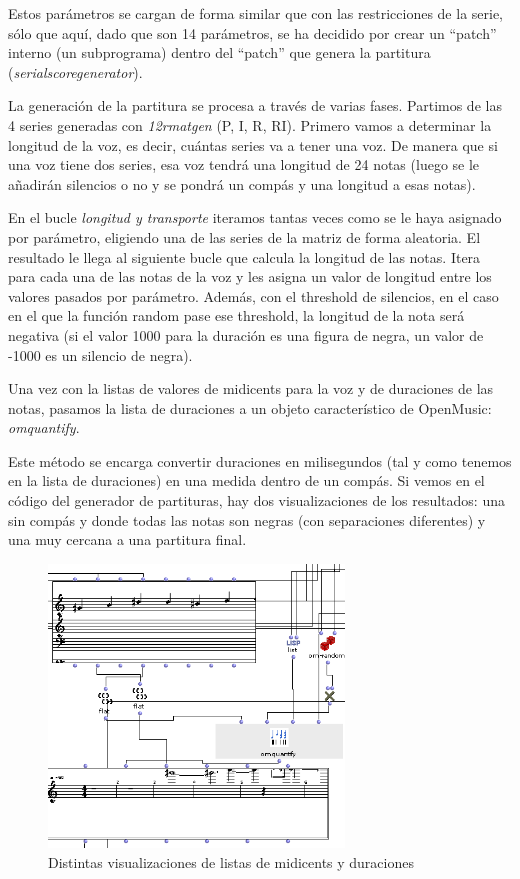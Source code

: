 \documentclass[a4paper,openany,oneside,12pt]{book}
\begin{document}
Estos parámetros se cargan de forma similar que con las restricciones de la serie, sólo que aquí, dado que son 14 parámetros, se ha decidido por crear un ``patch'' interno (un subprograma) dentro del ``patch'' que genera la partitura (\emph{serialscoregenerator}).

La generación de la partitura se procesa a través de varias fases. Partimos de las 4 series generadas con \emph{12rmatgen} (P, I, R, RI). Primero vamos a determinar la longitud de la voz, es decir, cuántas series va a tener una voz. De manera que si una voz tiene dos series, esa voz tendrá una longitud de 24 notas (luego se le añadirán silencios o no y se pondrá un compás y una longitud a esas notas).

En el bucle \emph{longitud y transporte} iteramos tantas veces como se le haya asignado por parámetro, eligiendo una de las series de la matriz de forma aleatoria. El resultado le llega al siguiente bucle que calcula la longitud de las notas. Itera para cada una de las notas de la voz y les asigna un valor de longitud entre los valores pasados por parámetro. Además, con el threshold de silencios, en el caso en el que la función random pase ese threshold, la longitud de la nota será negativa (si el valor 1000 para la duración es una figura de negra, un valor de -1000 es un silencio de negra).

Una vez con la listas de valores de midicents para la voz y de duraciones de las notas, pasamos la lista de duraciones a un objeto característico de OpenMusic: \emph{omquantify}.

Este método se encarga convertir duraciones en milisegundos (tal y como tenemos en la lista de duraciones) en una medida dentro de un compás. Si vemos en el código del generador de partituras, hay dos visualizaciones de los resultados: una sin compás y donde todas las notas son negras (con separaciones diferentes) y una muy cercana a una partitura final.

\begin{figure}
\centering
\includegraphics[width=0.7\textwidth]{img/visores.png}
\caption{Distintas visualizaciones de listas de midicents y duraciones} \label{fig:visores}
\end{figure}
\end{document}
